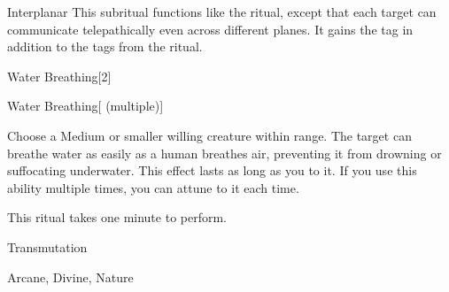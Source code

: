 \begin{ability}[\nth{8}]{Interplanar}
This subritual functions like the  ritual, except that each target can communicate telepathically even across different planes.
It gains the  tag in addition to the tags from the  ritual.
\end{ability}
\vspace{0.25em}


\begin{spellsection}{Water Breathing}[2]


\begin{ability}{Water Breathing}[ (multiple)]

Choose a Medium or smaller willing creature within \rngclose range.
The target can breathe water as easily as a human breathes air, preventing it from drowning or suffocating underwater.
This effect lasts as long as you  to it.
If you use this ability multiple times, you can attune to it each time.

This ritual takes one minute to perform.

\end{ability}




 Transmutation

 Arcane, Divine, Nature
\end{spellsection}
